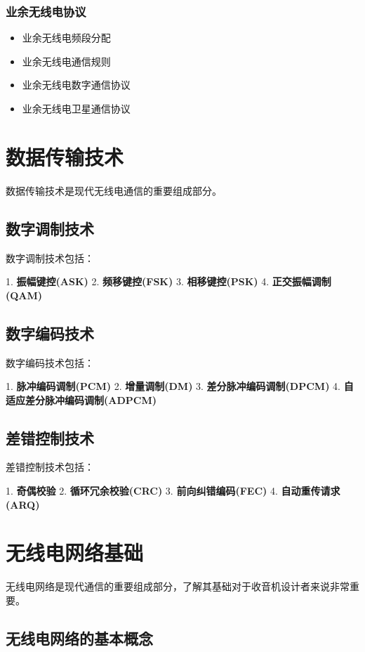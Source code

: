 \documentclass[12pt,UTF8]{ctexbook}
\begin{document}
\subsection{业余无线电协议}\begin{itemize}
  \item 业余无线电频段分配
  \item 业余无线电通信规则
  \item 业余无线电数字通信协议
  \item 业余无线电卫星通信协议\end{itemize}

\chapter{数据传输技术}

数据传输技术是现代无线电通信的重要组成部分。

\section{数字调制技术}

数字调制技术包括：

1. \textbf{振幅键控(ASK)}
2. \textbf{频移键控(FSK)}
3. \textbf{相移键控(PSK)}
4. \textbf{正交振幅调制(QAM)}

\section{数字编码技术}

数字编码技术包括：

1. \textbf{脉冲编码调制(PCM)}
2. \textbf{增量调制(DM)}
3. \textbf{差分脉冲编码调制(DPCM)}
4. \textbf{自适应差分脉冲编码调制(ADPCM)}

\section{差错控制技术}

差错控制技术包括：

1. \textbf{奇偶校验}
2. \textbf{循环冗余校验(CRC)}
3. \textbf{前向纠错编码(FEC)}
4. \textbf{自动重传请求(ARQ)}

\chapter{无线电网络基础}

无线电网络是现代通信的重要组成部分，了解其基础对于收音机设计者来说非常重要。

\section{无线电网络的基本概念}
\end{document}
